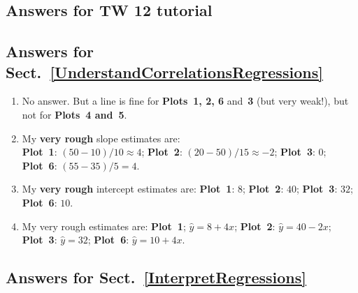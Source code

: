 \documentclass[
  11pt,
  a4paper,
  krantz2]{krantz}
\providecommand{\tightlist}{%
  \setlength{\itemsep}{0pt}\setlength{\parskip}{0pt}}
\begin{document}
\begin{footnotesize}
\section{Answers for TW 12 tutorial}\label{Lecture12Answers}

\subsection*{Answers for Sect.~\ref{UnderstandCorrelationsRegressions}}\label{answers-for-sect.-refunderstandcorrelationsregressions}

\begin{enumerate}
\def\labelenumi{\arabic{enumi}.}
\tightlist
\item
  No answer.
  But a line is fine for \textbf{Plots~1, 2, 6} and~\textbf{3} (but very weak!), but not for \textbf{Plots~4 and~5}.
\item
  My \textbf{very rough} slope estimates are:\\
  \textbf{Plot~1}: \((50-10)/10 \approx 4\); \textbf{Plot~2}: \((20 - 50)/15 \approx -2\);
  \textbf{Plot~3}: \(0\); \textbf{Plot~6}: \((55 - 35)/5 = 4\).
\item
  My \textbf{very rough} intercept estimates are:
  \textbf{Plot~1}: \(8\); \textbf{Plot~2}: \(40\);
  \textbf{Plot~3}: \(32\); \textbf{Plot~6}: \(10\).
\item
  My very rough estimates are:
  \textbf{Plot~1}; \(\hat{y} = 8 + 4x\); \textbf{Plot~2}: \(\hat{y} = 40 - 2x\);
  \textbf{Plot~3}: \(\hat{y} = 32\); \textbf{Plot~6}: \(\hat{y} = 10 + 4x\).
\end{enumerate}

\subsection*{Answers for Sect.~\ref{InterpretRegressions}}\label{answers-for-sect.-refinterpretregressions}


\end{footnotesize}
\end{document}
